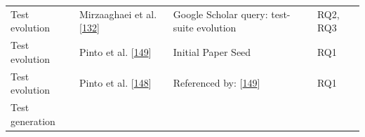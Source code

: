 \documentclass[]{book}
\begin{document}
\begin{longtable}[]{@{}llll@{}}
\begin{minipage}[t]{0.18\columnwidth}\raggedright\strut
Test evolution\strut
\end{minipage} & \begin{minipage}[t]{0.16\columnwidth}\raggedright\strut
Mirzaaghaei et al.
{[}\protect\hyperlink{ref-supportingtestsuite}{132}{]}\strut
\end{minipage} & \begin{minipage}[t]{0.50\columnwidth}\raggedright\strut
Google Scholar query: test-suite evolution\strut
\end{minipage} & \begin{minipage}[t]{0.04\columnwidth}\raggedright\strut
RQ2, RQ3\strut
\end{minipage}\tabularnewline
\begin{minipage}[t]{0.18\columnwidth}\raggedright\strut
Test evolution\strut
\end{minipage} & \begin{minipage}[t]{0.16\columnwidth}\raggedright\strut
Pinto et al.
{[}\protect\hyperlink{ref-pinto2012understanding}{149}{]}\strut
\end{minipage} & \begin{minipage}[t]{0.50\columnwidth}\raggedright\strut
Initial Paper Seed\strut
\end{minipage} & \begin{minipage}[t]{0.04\columnwidth}\raggedright\strut
RQ1\strut
\end{minipage}\tabularnewline
\begin{minipage}[t]{0.18\columnwidth}\raggedright\strut
Test evolution\strut
\end{minipage} & \begin{minipage}[t]{0.16\columnwidth}\raggedright\strut
Pinto et al. {[}\protect\hyperlink{ref-pinto2013}{148}{]}\strut
\end{minipage} & \begin{minipage}[t]{0.50\columnwidth}\raggedright\strut
Referenced by:
{[}\protect\hyperlink{ref-pinto2012understanding}{149}{]}\strut
\end{minipage} & \begin{minipage}[t]{0.04\columnwidth}\raggedright\strut
RQ1\strut
\end{minipage}\tabularnewline
\begin{minipage}[t]{0.18\columnwidth}\raggedright\strut
Test generation\strut
\end{minipage} & \begin{minipage}[t]{0.16\columnwidth}\raggedright\strut

\end{minipage}
\end{longtable}
\end{document}
